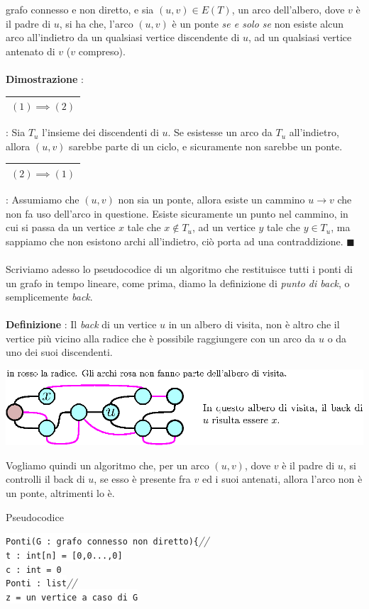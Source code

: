\documentclass[12pt, letterpaper]{article}
\newcommand{\codee}[1]{\colorbox{white}{\texttt{#1}}}
\newcommand{\acc}{\\\hphantom{}\\}
\newcommand{\comm}[1]{\color{lg}\textit{\hphantom{spaz}// \text{#1}}\color{black}}
\newcommand{\boxedMath}[1]{\begin{tabular}{|c|}\hline \texttt{#1} \\ \hline\end{tabular} :}
\begin{document}
grafo connesso e non diretto, e sia $(u,v)\in E(T)$, un arco dell'albero, dove $v$ è il padre di $u$, si ha che, 
l'arco  $(u,v)$ è un ponte \textit{se e solo se} non esiste alcun arco all'indietro da un qualsiasi vertice 
discendente di $u$, ad un qualsiasi vertice antenato di $v$ ($v$ compreso).\acc 
\textbf{Dimostrazione} : \boxedMath{$(1)\implies(2)$} Sia $T_u$ l'insieme dei discendenti di $u$. Se esistesse un arco da  $T_u$ all'indietro, 
allora $(u,v)$ sarebbe parte di un ciclo, e sicuramente non sarebbe un ponte. \boxedMath{$(2)\implies(1)$} Assumiamo che 
$(u,v)$ non sia un ponte, allora esiste un cammino $u\rightarrow v$ che non fa uso dell'arco in questione. Esiste sicuramente 
un punto nel cammino, in cui si passa da un vertice $x$ tale che $x\notin T_u$, ad un vertice $y$ tale che 
$y\in T_u$, ma sappiamo che non esistono archi all'indietro, ciò porta ad una contraddizione. $\blacksquare$\acc 
Scriviamo adesso lo pseudocodice di un algoritmo che restituisce tutti i ponti di un grafo in tempo lineare, come prima, diamo 
la definizione di \textit{punto di back}, o semplicemente \textit{back}.\acc 
\textbf{Definizione} : Il \textit{back} di un vertice $u$ in un albero di visita, non è altro che il vertice più 
vicino alla radice che è possibile raggiungere con un arco da $u$ o da uno dei suoi discendenti.\begin{center}
    \includegraphics[width=1\textwidth ]{images/back.eps}
\end{center} 
Vogliamo quindi un algoritmo che, per un arco $(u,v)$, dove $v$ è il padre di $u$, si controlli il 
back di $u$, se esso è presente fra $v$ ed i suoi antenati, allora l'arco non è un ponte, altrimenti lo è. 
\begin{center}
    Pseudocodice
\end{center} 
\codee{Ponti(G : grafo connesso non diretto)\{}\comm{funzione globale}\\
\hphantom{ident}\codee{t : int[n] = [0,0...,0]}\\
\hphantom{ident}\codee{c : int = 0}\\
\hphantom{ident}\codee{Ponti : list}\comm{l'output}\\
\hphantom{ident}\codee{z = un vertice a caso di G}\\
\end{document}
